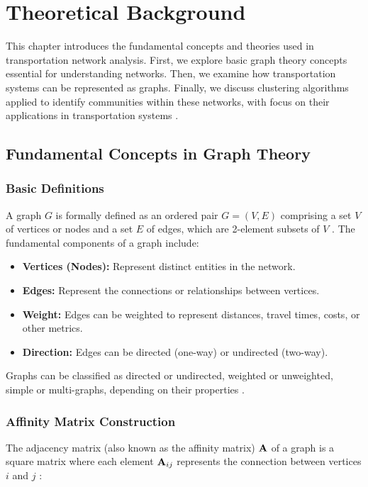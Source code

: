 \chapter{Theoretical Background}
\label{ch:basics}
This chapter introduces the fundamental concepts and theories used in transportation network analysis. First, we explore basic graph theory concepts essential for understanding networks. Then, we examine how transportation systems can be represented as graphs. Finally, we discuss clustering algorithms applied to identify communities within these networks, with focus on their applications in transportation systems .

\section{Fundamental Concepts in Graph Theory}
\label{se:FundamentalConcepts}

\subsection{Basic Definitions}
\label{subsec:BasicDefinitions}

A graph $G$ is formally defined as an ordered pair $G = (V, E)$ comprising a set $V$ of vertices or nodes and a set $E$ of edges, which are 2-element subsets of $V$ . The fundamental components of a graph include:

\begin{itemize}
    \item \textbf{Vertices (Nodes):} Represent distinct entities in the network.
    \item \textbf{Edges:} Represent the connections or relationships between vertices.
    \item \textbf{Weight:} Edges can be weighted to represent distances, travel times, costs, or other metrics.
    \item \textbf{Direction:} Edges can be directed (one-way) or undirected (two-way).
\end{itemize}

Graphs can be classified as directed or undirected, weighted or unweighted, simple or multi-graphs, depending on their properties .

\subsection{Affinity Matrix Construction}
\label{subsec:AffinityMatrix}

The adjacency matrix (also known as the affinity matrix) $\mathbf{A}$ of a graph is a square matrix where each element $\mathbf{A}_{ij}$ represents the connection between vertices $i$ and $j$ :

